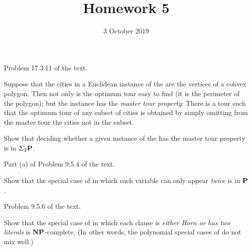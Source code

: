\documentclass{../math167}
\title{Homework 5}
\author{}
\date{3 October 2019}
\begin{document}
\begin{problems}
\item Problem 17.3.11 of the text.
  \begin{book}
    Suppose that the cities in a Euclidean instance of the \TSP{} are
    the vertices of a convex polygon.  Then not only is the optimum
    tour easy to find (it is the perimeter of the polygon); but the
    instance has the \emph{master tour property}: There is a tour such
    that the optimum tour of any subset of cities is obtained by
    simply omitting from the master tour the cities not in the subset.

    Show that deciding whether a given instance of the \TSP{} has the
    master tour property is in \(\Sigma_2 \P\).
  \end{book}

  \begin{solution}
  \end{solution}

\item Part (a) of Problem 9.5.4 of the text.
  \begin{book}
    Show that the special case of \SAT{} in which each variable can
    only appear \emph{twice} is in \(\P\).
  \end{book}

  \begin{solution}
  \end{solution}

\item Problem 9.5.6 of the text.
  \begin{book}
    Show that the special case of \SAT{} in which each clause is
    \emph{either Horn or has two literals} is \(\NP\)-complete.  (In
    other words, the polynomial special cases of \SAT{} do not mix
    well.)
  \end{book}

  \begin{solution}
  \end{solution}

\end{problems}
\end{document}
